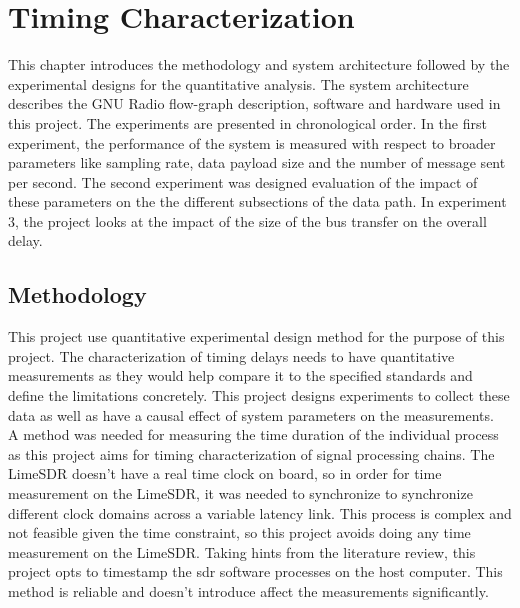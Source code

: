 \chapter{Timing Characterization}
This chapter introduces the methodology and system architecture followed by the experimental designs for the quantitative analysis.
The system architecture describes the GNU Radio flow-graph description, software and hardware used in this project. The experiments are presented in chronological order. In the first experiment, the performance of the system is measured with respect to broader parameters like sampling rate, data payload size and the number of message sent per second. The second experiment was designed evaluation of the impact of these parameters on the the different subsections of the data path. In experiment 3, the project looks at the impact of the size of the bus transfer on the overall delay.

\section{Methodology}
This project use quantitative experimental design method for the purpose of this project.
The characterization of timing delays needs to have quantitative measurements as they would help compare it to the specified standards and define the limitations concretely.
This project designs experiments to collect these data as well as have a causal effect of system parameters on the measurements.\\

A method was needed for measuring the time duration of the individual process as this project aims for timing characterization of signal processing chains.
The LimeSDR doesn't have a real time clock on board, so in order for time measurement on the LimeSDR, it was needed to synchronize to synchronize different clock domains across a variable latency link.
This process is complex and not feasible given the time constraint, so this project avoids doing any time measurement on the LimeSDR.
Taking hints from the literature review, this project opts to timestamp the \ac{sdr} software processes on the host computer.
This method is reliable and doesn't introduce affect the measurements significantly.\\

